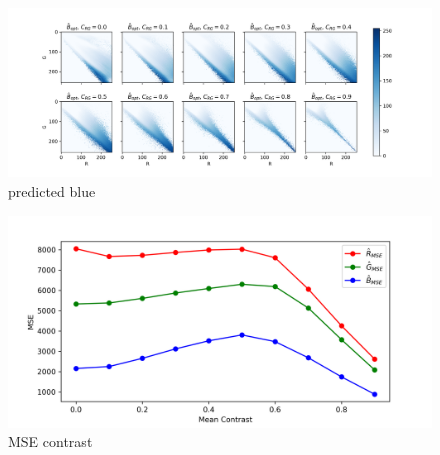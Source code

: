 \documentclass[11pt]{scrartcl} %
\begin{document}
\begin{figure}[h] %
	\centering
	\includegraphics[width=1\columnwidth]{Figure/predicted_blue} %
	\caption{predicted blue}
	\label{predicted blue}
\end{figure}

\begin{figure}[h] %
	\centering
	\includegraphics[width=1\columnwidth]{Figure/MSE_contrast} %
	\caption{MSE contrast}
	\label{MSE}
\end{figure}
\end{document}
